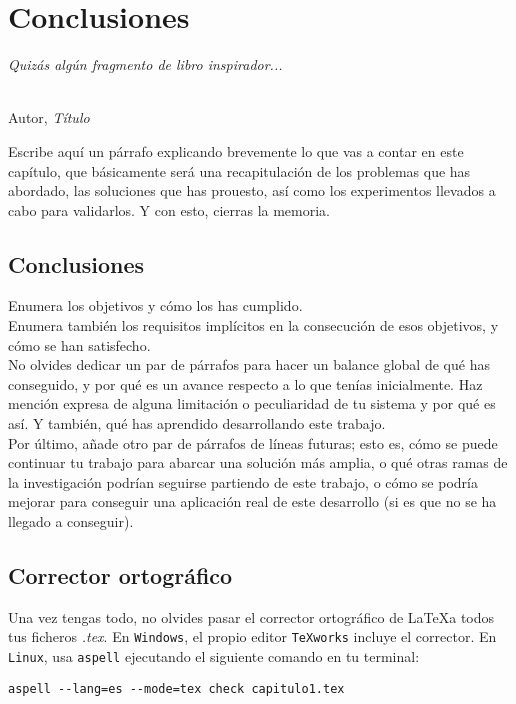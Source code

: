 \chapter{Conclusiones}
\label{cap:capitulo7}

\begin{flushright}
\begin{minipage}[]{10cm}
\emph{Quizás algún fragmento de libro inspirador...}\\
\end{minipage}\\

Autor, \textit{Título}\\
\end{flushright}

\vspace{1cm}

Escribe aquí un párrafo explicando brevemente lo que vas a contar en este capítulo, que básicamente será una recapitulación de los problemas que has abordado, las soluciones que has prouesto, así como los experimentos llevados a cabo para validarlos. Y con esto, cierras la memoria.

\section{Conclusiones}

Enumera los objetivos y cómo los has cumplido.\\

Enumera también los requisitos implícitos en la consecución de esos objetivos, y cómo se han satisfecho.\\

No olvides dedicar un par de párrafos para hacer un balance global de qué has conseguido, y por qué es un avance respecto a lo que tenías inicialmente. Haz mención expresa de alguna limitación o peculiaridad de tu sistema y por qué es así. Y también, qué has aprendido desarrollando este trabajo.\\

Por último, añade otro par de párrafos de líneas futuras; esto es, cómo se puede continuar tu trabajo para abarcar una solución más amplia, o qué otras ramas de la investigación podrían seguirse partiendo de este trabajo, o cómo se podría mejorar para conseguir una aplicación real de este desarrollo (si es que no se ha llegado a conseguir).

\section{Corrector ortográfico}

Una vez tengas todo, no olvides pasar el corrector ortográfico de \LaTeX a todos tus ficheros \textit{.tex}. En \texttt{Windows}, el propio editor \texttt{TeXworks} incluye el corrector. En \texttt{Linux}, usa \texttt{aspell} ejecutando el siguiente comando en tu terminal:

\begin{verbatim}
aspell --lang=es --mode=tex check capitulo1.tex
\end{verbatim}

